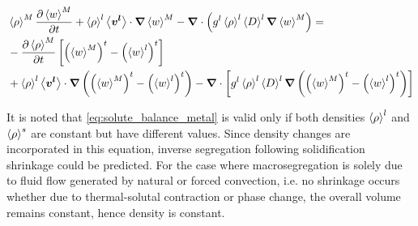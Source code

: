 %

\begin{align}
\label{eq:solute_balance_metal}
\begin{split}
 & \avg{\rho}^M \tempup{\avg{w}^M}  + \rhol  \vit \cdot \nabvec \avg{w}^M - \nabvec \cdot \brac{\gl \rhol \Dl \nabvec \avg{w}^M}=\\
 &	 - \tempup{\avg{\rho}^M} \crochet{\brac{\avg{w}^M}^t - \brac{\wl}^t} \\ 
 &	 + \rhol \vit \cdot \nabvec \brac{\brac{\avg{w}^M}^t -\brac{\wl}^t}
 	 - \nabvec \cdot \crochet{\gl \rhol \Dl  \nabvec \brac{\brac{\avg{w}^M}^t -\brac{\wl}^t} }
  \end{split}
  \end{align}

It is noted that \cref{eq:solute_balance_metal} is valid only if both densities $\left \langle \rho \right \rangle^l$ and $\left \langle \rho \right \rangle^s$
are constant but have different values. Since density changes are incorporated in this equation, 
inverse segregation following solidification shrinkage could be predicted.
For the case where macrosegregation is solely due to fluid flow generated by natural or forced convection, 
i.e. no shrinkage occurs whether due to thermal-solutal contraction or phase change, 
the overall volume remains constant, hence density is constant.


